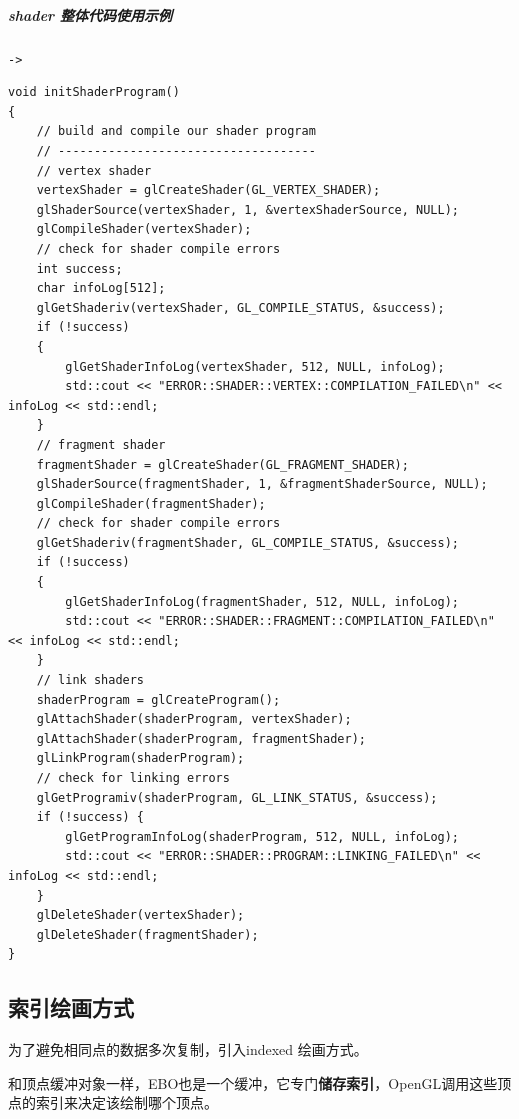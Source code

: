 \documentclass[UTF8,a4paper,12pt]{ctexbook}
\begin{document}
				
				\subparagraph{shader 整体代码使用示例}
					\verb|->|
					
					\begin{lstlisting}
void initShaderProgram()
{
	// build and compile our shader program
	// ------------------------------------
	// vertex shader
	vertexShader = glCreateShader(GL_VERTEX_SHADER);
	glShaderSource(vertexShader, 1, &vertexShaderSource, NULL);
	glCompileShader(vertexShader);
	// check for shader compile errors
	int success;
	char infoLog[512];
	glGetShaderiv(vertexShader, GL_COMPILE_STATUS, &success);
	if (!success)
	{
		glGetShaderInfoLog(vertexShader, 512, NULL, infoLog);
		std::cout << "ERROR::SHADER::VERTEX::COMPILATION_FAILED\n" << infoLog << std::endl;
	}
	// fragment shader
	fragmentShader = glCreateShader(GL_FRAGMENT_SHADER);
	glShaderSource(fragmentShader, 1, &fragmentShaderSource, NULL);
	glCompileShader(fragmentShader);
	// check for shader compile errors
	glGetShaderiv(fragmentShader, GL_COMPILE_STATUS, &success);
	if (!success)
	{
		glGetShaderInfoLog(fragmentShader, 512, NULL, infoLog);
		std::cout << "ERROR::SHADER::FRAGMENT::COMPILATION_FAILED\n" << infoLog << std::endl;
	}
	// link shaders
	shaderProgram = glCreateProgram();
	glAttachShader(shaderProgram, vertexShader);
	glAttachShader(shaderProgram, fragmentShader);
	glLinkProgram(shaderProgram);
	// check for linking errors
	glGetProgramiv(shaderProgram, GL_LINK_STATUS, &success);
	if (!success) {
		glGetProgramInfoLog(shaderProgram, 512, NULL, infoLog);
		std::cout << "ERROR::SHADER::PROGRAM::LINKING_FAILED\n" << infoLog << std::endl;
	}
	glDeleteShader(vertexShader);
	glDeleteShader(fragmentShader);
}					
					\end{lstlisting}
				
		
		\subsection{索引绘画方式}
			为了避免相同点的数据多次复制，引入indexed 绘画方式。
		
			和顶点缓冲对象一样，EBO也是一个缓冲，它专门\textbf{储存索引}，OpenGL调用这些顶点的索引来决定该绘制哪个顶点。
			
\end{document}
